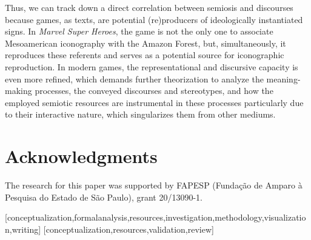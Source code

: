 \documentclass[english]{textolivre}
\begin{document}
Thus, we can track down a direct correlation between semiosis and discourses because games, as texts, are potential (re)producers of ideologically instantiated signs. In \textit{Marvel Super Heroes}, the game is not the only one to associate Mesoamerican iconography with the Amazon Forest, but, simultaneously, it reproduces these referents and serves as a potential source for iconographic reproduction. In modern games, the representational and discursive capacity is even more refined, which demands further theorization to analyze the meaning-making processes, the conveyed discourses and stereotypes, and how the employed semiotic resources are instrumental in these processes particularly due to their interactive nature, which singularizes them from other mediums.


\section{Acknowledgments}\label{sec-quotesandfootnotes}
The research for this paper was supported by FAPESP (Fundação de Amparo à Pesquisa do Estado de São Paulo), grant 20/13090-1.

\printbibliography\label{sec-bib}


\begin{contributors}
[conceptualization,formalanalysis,resources,investigation,methodology,visualization,writing]
[conceptualization,resources,validation,review]
\end{contributors}
\end{document}
